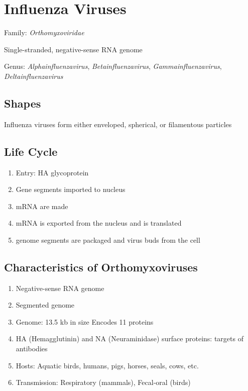 \documentclass{notes}
\begin{document}
\section{Influenza Viruses}

Family: \textit{Orthomyxoviridae}

Single-stranded, negative-sense RNA genome

Genus: \textit{Alphainfluenzavirus}, \textit{Betainfluenzavirus}, \textit{Gammainfluenzavirus}, \textit{Deltainfluenzavirus}

\subsection{Shapes}

Influenza viruses form either enveloped, spherical, or filamentous particles

\subsection{Life Cycle}

\begin{enumerate}
    \item Entry: HA glycoprotein
    \item Gene segments imported to nucleus
    \item mRNA are made
    \item mRNA is exported from the nucleus and is translated
    \item genome segments are packaged and virus buds from the cell
\end{enumerate}

\subsection{Characteristics of Orthomyxoviruses}

\begin{enumerate}
    \item Negative-sense RNA genome
    \item Segmented genome
    \item Genome: 13.5 kb in size
    \subitem Encodes 11 proteins
    \item HA (Hemagglutinin) and NA (Neuraminidase) surface proteins: targets of antibodies
    \item Hosts: Aquatic birds, humans, pigs, horses, seals, cows, etc.
    \item Transmission: Respiratory (mammals), Fecal-oral (birds)
\end{enumerate}
\end{document}

